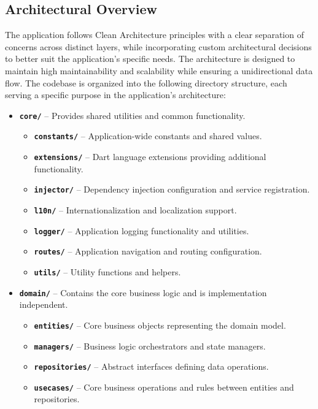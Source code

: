 \subsection{Architectural Overview}
\label{sec:architectural-overview}

The application follows Clean Architecture \cite{cite:clean_architecture} principles with a clear separation of concerns across distinct layers, while incorporating custom architectural decisions to better suit the application's specific needs. The architecture is designed to maintain high maintainability and scalability while ensuring a unidirectional data flow. The codebase is organized into the following directory structure, each serving a specific purpose in the application's architecture:

\begin{itemize}
    \item \textbf{\texttt{core/}} – Provides shared utilities and common functionality.
    \begin{itemize}
        \item \textbf{\texttt{constants/}} – Application-wide constants and shared values.
        \item \textbf{\texttt{extensions/}} – Dart language extensions providing additional functionality.
        \item \textbf{\texttt{injector/}} – Dependency injection configuration and service registration.
        \item \textbf{\texttt{l10n/}} – Internationalization and localization support.
        \item \textbf{\texttt{logger/}} – Application logging functionality and utilities.
        \item \textbf{\texttt{routes/}} – Application navigation and routing configuration.
        \item \textbf{\texttt{utils/}} – Utility functions and helpers.
    \end{itemize}

    \item \textbf{\texttt{domain/}} – Contains the core business logic and is implementation independent.
    \begin{itemize}
        \item \textbf{\texttt{entities/}} – Core business objects representing the domain model.
        \item \textbf{\texttt{managers/}} – Business logic orchestrators and state managers.
        \item \textbf{\texttt{repositories/}} – Abstract interfaces defining data operations.
        \item \textbf{\texttt{usecases/}} – Core business operations and rules between entities and repositories.
    \end{itemize}
    

\end{itemize}

